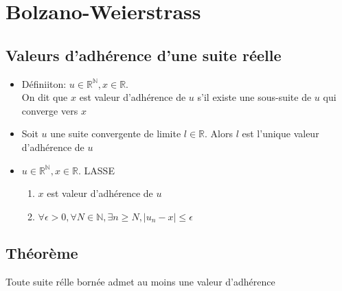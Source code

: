 \documentclass[fleqn]{article}
\begin{document}
\section{Bolzano-Weierstrass}
\subsection{Valeurs d'adh\'erence d'une suite r\'eelle}
\begin{itemize}
	\item D\'efiniiton: $u \in \mathbb{R}^\mathbb{N}, x \in \mathbb{R}$. \\
		On dit que $x$ est valeur d'adh\'erence de $u$ s'il existe une sous-suite de $u$ qui converge vers $x$
	\item Soit $u$ une suite convergente de limite $l \in \mathbb{R}$. Alors $l$ est l'unique valeur d'adh\'erence de $u$
	\item $u \in \mathbb{R}^\mathbb{N}, x \in \mathbb{R}$. LASSE
	\begin{enumerate}
		\item $x$ est valeur d'adh\'erence de $u$
		\item $\forall \epsilon > 0, \forall N \in \mathbb{N}, \exists n \geq N, |u_n - x| \leq \epsilon$
	\end{enumerate}
\end{itemize}

\subsection{Th\'eor\`eme}
Toute suite r\'elle born\'ee admet au moins une valeur d'adh\'erence
\end{document}
